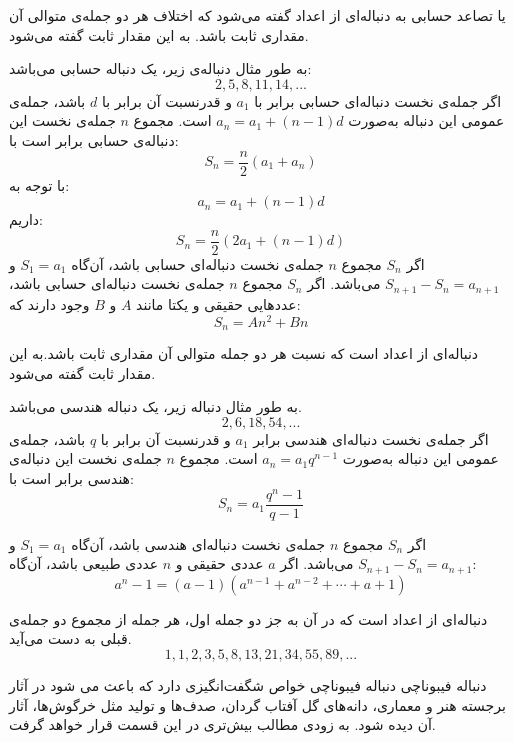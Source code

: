 \begin{definition}
    \p
    یا تصاعد حسابی به دنباله‌ای از اعداد گفته می‌شود که اختلاف هر دو جمله‌ی متوالی آن مقداری ثابت باشد. به این مقدار ثابت 
      گفته می‌شود.
\end{definition}
	\p
به طور مثال دنباله‌ی زیر، یک دنباله‌ حسابی می‌باشد:
$$2, 5, 8, 11, 14, ...$$
	\p
اگر جمله‌ی نخست دنباله‌ای حسابی برابر با
$a_1$
 و قدرنسبت آن برابر با
$d$
باشد، جمله‌ی عمومی این دنباله به‌صورت 
$a_n = a_1 + (n - 1)d$
است. مجموع
$n$
جمله‌ی نخست این دنباله‌ی حسابی برابر است با:
$$S_n = \frac{n}{2}(a_1 + a_n)$$
با توجه به:
$$a_n = a_1 + (n - 1)d$$
داریم:
$$S_n = \frac{n}{2}(2a_1 + (n - 1)d)$$
	\p
اگر
$S_n$
مجموع
$n$
جمله‌ی نخست دنباله‌ای حسابی باشد، آن‌گاه
$S_1 = a_1$
و
$S_{n+1} - S_n = a_{n+1}$
می‌باشد.
	\p
اگر
$S_n$
مجموع
$n$
جمله‌ی نخست دنباله‌ای حسابی باشد، عددهایی حقیقی و یکتا مانند
$A$
و
$B$
وجود دارند که:
$$S_n = An^2 + Bn$$
	\p




\begin{definition}
    \p
   دنباله‌ای از اعداد است که نسبت هر دو جمله متوالی آن مقداری ثابت باشد.به این مقدار ثابت 
  گفته می‌شود.    
\end{definition}
	\p
به طور مثال دنباله زیر، یک دنباله هندسی می‌باشد.
	\p
$$2, 6, 18, 54, ...$$
	\p
اگر جمله‌ی نخست دنباله‌ای هندسی برابر
$a_1$
و قدر‌نسبت آن برابر با
$q$
باشد، جمله‌ی عمومی این دنباله به‌صورت 
$a_n = a_1q^{n-1}$
 است. مجموع 
$n$
جمله‌ی نخست این دنباله‌ی هندسی برابر است با:
$$S_n = a_1\frac{q^n - 1}{q - 1}$$

	\p
اگر
$S_n$
مجموع
$n$
جمله‌ی نخست دنباله‌ای هندسی باشد، آن‌گاه
$S_1 = a_1$
و
$S_{n+1} - S_n = a_{n+1}$
می‌باشد.
	\p
اگر
$a$
عددی حقیقی و 
$n$
 عددی طبیعی باشد، آن‌گاه:
$$a^n - 1 = (a - 1)(a^{n-1} + a^{n-2} + \cdots + a + 1)$$




\begin{definition}
    \p
    دنباله‌ای از اعداد است که در آن به جز دو جمله اول، هر جمله از مجموع دو جمله‌ی قبلی به دست می‌آید.
    \p
  $$1, 1, 2, 3, 5, 8, 13, 21, 34, 55, 89, ...$$
	\p 
\end{definition}
\begin{extra}{دنباله فیبوناچی}
دنباله فیبوناچی خواص شگفت‌انگیزی دارد که باعث می شود در آثار برجسته هنر و معماری، دانه‌های گل آفتاب گردان، صدف‌ها و تولید مثل خرگوش‌ها، آثار آن دیده شود. به زودی مطالب بیش‌تری در این قسمت قرار خواهد گرفت.
\end{extra}


